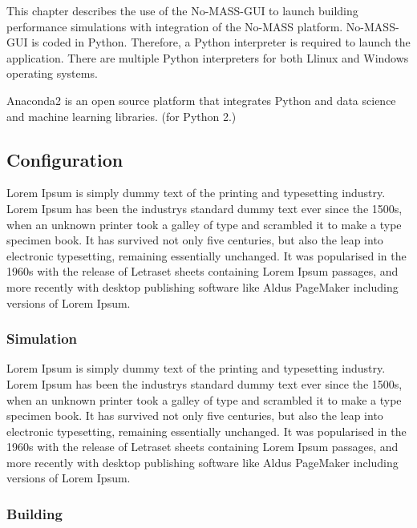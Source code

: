 

This chapter describes the use of the No-\/\+M\+A\+S\+S-\/\+G\+UI to launch building performance simulations with integration of the No-\/\+M\+A\+SS platform. No-\/\+M\+A\+S\+S-\/\+G\+UI is coded in Python. Therefore, a Python interpreter is required to launch the application. There are multiple Python interpreters for both Llinux and Windows operating systems.

Anaconda2 is an open source platform that integrates Python and data science and machine learning libraries. (for Python 2.)

 

\subsection*{Configuration}

 Lorem Ipsum is simply dummy text of the printing and typesetting industry. Lorem Ipsum has been the industry\textquotesingle{}s standard dummy text ever since the 1500s, when an unknown printer took a galley of type and scrambled it to make a type specimen book. It has survived not only five centuries, but also the leap into electronic typesetting, remaining essentially unchanged. It was popularised in the 1960s with the release of Letraset sheets containing Lorem Ipsum passages, and more recently with desktop publishing software like Aldus Page\+Maker including versions of Lorem Ipsum.

 

\subsubsection*{Simulation}

 Lorem Ipsum is simply dummy text of the printing and typesetting industry. Lorem Ipsum has been the industry\textquotesingle{}s standard dummy text ever since the 1500s, when an unknown printer took a galley of type and scrambled it to make a type specimen book. It has survived not only five centuries, but also the leap into electronic typesetting, remaining essentially unchanged. It was popularised in the 1960s with the release of Letraset sheets containing Lorem Ipsum passages, and more recently with desktop publishing software like Aldus Page\+Maker including versions of Lorem Ipsum.

 

\subsubsection*{Building}

